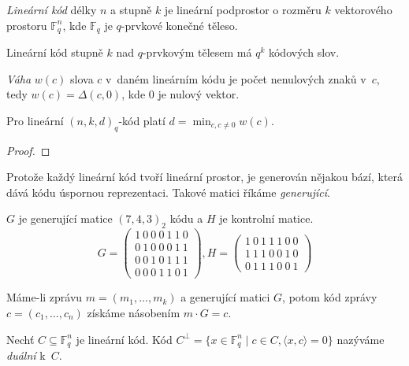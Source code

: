 \begin{definition}
    {\em Lineární kód} délky $n$ a stupně $k$
    je lineární podprostor o rozměru $k$
    vektorového prostoru $\mathbb{F}^n_q$,
    kde $\mathbb{F}_q$ je $q$-prvkové konečné těleso.
\end{definition}

Lineární kód stupně $k$ nad $q$-prvkovým tělesem má $q^k$ kódových slov.

\begin{definition}
    {\em Váha} $w(c)$ slova $c$ v~daném lineárním kódu je počet
    nenulových znaků v~$c$, tedy $w(c) = \Delta(c, 0)$, kde $0$ je
    nulový vektor.
\end{definition}

\begin{claim}
Pro lineární $(n,k,d)_q$-kód platí $d = \min_{c, c \neq 0} w(c)$.
\end{claim}

\begin{proof}
\end{proof}

Protože každý lineární kód tvoří lineární prostor, je generován nějakou
bází, která dává kódu úspornou reprezentaci. Takové matici říkáme
{\em generující}.

\begin{example}
    $G$ je generující matice $(7,4,3)_2$ kódu
    a $H$ je kontrolní matice.
\[
G =
\begin{pmatrix}
    1\ 0\ 0\ 0\ 1\ 1\ 0 \\
    0\ 1\ 0\ 0\ 0\ 1\ 1 \\
    0\ 0\ 1\ 0\ 1\ 1\ 1 \\
    0\ 0\ 0\ 1\ 1\ 0\ 1
\end{pmatrix},
H =
\begin{pmatrix}
    1\ 0\ 1\ 1\ 1\ 0\ 0 \\
    1\ 1\ 1\ 0\ 0\ 1\ 0 \\
    0\ 1\ 1\ 1\ 0\ 0\ 1
\end{pmatrix}
\]

\end{example}

Máme-li zprávu $m = (m_1,\ldots,m_k)$ a generující matici $G$,
potom kód zprávy $c = (c_1, \ldots, c_n)$
získáme násobením $m \cdot G = c$.

\begin{definition}
    Nechť $C \subseteq \mathbb{F}^n_q$ je lineární kód.
    Kód $C^\bot = \{ x \in \mathbb{F}^n_q \mid c \in C, \langle x,c \rangle = 0 \}$
    nazýváme {\em duální} k~$C$.
\end{definition}

